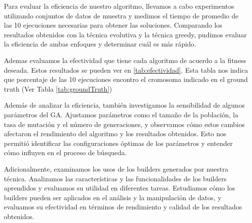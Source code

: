 


Para evaluar la eficiencia de nuestro algoritmo, llevamos a cabo experimentos utilizando conjuntos de datos de muestra y medimos el tiempo de promedio de las 10 ejecuciones necesarias para obtener las soluciones. Comparando los resultados obtenidos con la técnica evolutiva y la técnica greedy, pudimos evaluar la eficiencia de ambas enfoques y determinar cuál es más rápido.

Ademas evaluamos la efectividad que tiene cada algoritmo de acuerdo a la fitness deseada. Estos resultados se pueden ver en \ref{tab:efectividad}. Esta tabla nos indica que porcentaje de las 10 ejecuciones encontro el cromosoma indicado en el ground truth (Ver Tabla \ref{tab:groundTruth})




Además de analizar la eficiencia, también investigamos la sensibilidad de algunos parámetros del GA. Ajustamos parámetros como el tamaño de la población, la tasa de mutación y el número de generaciones, y observamos cómo estos cambios afectaron el rendimiento del algoritmo y los resultados obtenidos. Esto nos permitió identificar las configuraciones óptimas de los parámetros y entender cómo influyen en el proceso de búsqueda.

Adicionalmente, examinamos los usos de los builders generados por nuestra técnica. Analizamos las características y las funcionalidades de los builders aprendidos y evaluamos su utilidad en diferentes tareas. Estudiamos cómo los builders pueden ser aplicados en el análisis y la manipulación de datos, y evaluamos su efectividad en términos de rendimiento y calidad de los resultados obtenidos.







